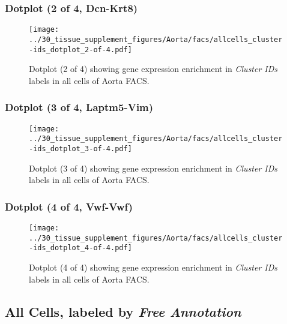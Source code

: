 \clearpage

\subsubsection{Dotplot (2 of 4, Dcn-Krt8)}
\begin{figure}[h]
\centering
\texttt{[image: ../30\_tissue\_supplement\_figures/Aorta/facs/allcells\_cluster-ids\_dotplot\_2-of-4.pdf]}

\caption{ Dotplot (2 of 4)  showing gene expression enrichment in \emph{Cluster IDs} labels in all cells of Aorta FACS. }
\end{figure}


\clearpage

\subsubsection{Dotplot (3 of 4, Laptm5-Vim)}
\begin{figure}[h]
\centering
\texttt{[image: ../30\_tissue\_supplement\_figures/Aorta/facs/allcells\_cluster-ids\_dotplot\_3-of-4.pdf]}

\caption{ Dotplot (3 of 4)  showing gene expression enrichment in \emph{Cluster IDs} labels in all cells of Aorta FACS. }
\end{figure}


\clearpage

\subsubsection{Dotplot (4 of 4, Vwf-Vwf)}
\begin{figure}[h]
\centering
\texttt{[image: ../30\_tissue\_supplement\_figures/Aorta/facs/allcells\_cluster-ids\_dotplot\_4-of-4.pdf]}

\caption{ Dotplot (4 of 4)  showing gene expression enrichment in \emph{Cluster IDs} labels in all cells of Aorta FACS. }
\end{figure}


\clearpage

\subsection{All Cells, labeled by \emph{Free Annotation}}
